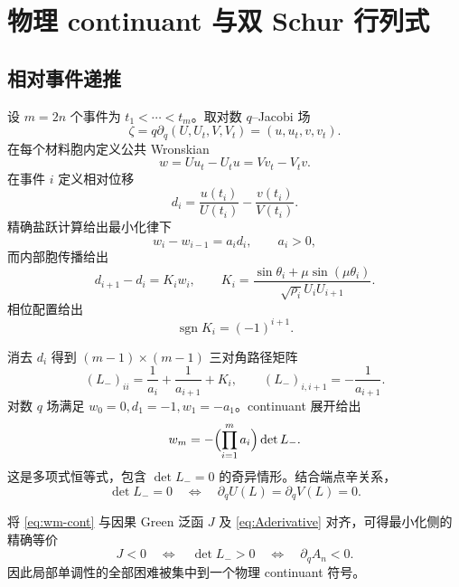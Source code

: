 \documentclass[UTF8,12pt,openany,fontset=fandol]{ctexrep}
\theoremstyle{definition}
\newcommand{\sgn}{\operatorname{sgn}}
\begin{document}
\chapter{物理 continuant 与双 Schur 行列式}

\section{相对事件递推}

设 $m=2n$ 个事件为 $t_1<\cdots<t_m$。取对数 $q$--Jacobi 场
\begin{equation}
 \zeta=q\partial_q(U,U_t,V,V_t)=(u,u_t,v,v_t).
\end{equation}
在每个材料胞内定义公共 Wronskian
\begin{equation}
 w=Uu_t-U_tu=Vv_t-V_tv.
\end{equation}
在事件 $i$ 定义相对位移
\begin{equation}
 d_i=\frac{u(t_i)}{U(t_i)}-\frac{v(t_i)}{V(t_i)}.
\end{equation}
精确盐跃计算给出最小化律下
\begin{equation}\label{eq:eventrec1}
 w_i-w_{i-1}=a_i d_i,\qquad a_i>0,
\end{equation}
而内部胞传播给出
\begin{equation}\label{eq:eventrec2}
 d_{i+1}-d_i=K_iw_i,\qquad
 K_i=\frac{\sin\theta_i+\mu\sin(\mu\theta_i)}{\sqrt{\rho_i}U_iU_{i+1}}.
\end{equation}
相位配置给出
\begin{equation}
 \sgn K_i=(-1)^{i+1}.
\end{equation}

消去 $d_i$ 得到 $(m-1)\times(m-1)$ 三对角路径矩阵
\begin{equation}\label{eq:Lminus}
 (L_-)_{ii}=\frac1{a_i}+\frac1{a_{i+1}}+K_i,\qquad
 (L_-)_{i,i+1}=-\frac1{a_{i+1}}.
\end{equation}
对数 $q$ 场满足 $w_0=0,d_1=-1,w_1=-a_1$。continuant 展开给出
\begin{equation}\label{eq:wm-cont}
 w_m=-\Bigl(\prod_{i=1}^m a_i\Bigr)\det L_-.
\end{equation}
这是多项式恒等式，包含 $\det L_-=0$ 的奇异情形。结合端点辛关系，
\begin{equation}
 \det L_-=0\quad\Longleftrightarrow\quad
 \partial_qU(L)=\partial_qV(L)=0.
\end{equation}

将 \eqref{eq:wm-cont} 与因果 Green 泛函 $J$ 及 \eqref{eq:Aderivative} 对齐，可得最小化侧的精确等价
\begin{equation}\label{eq:R7bridge}
 J<0\quad\Longleftrightarrow\quad
 \det L_->0\quad\Longleftrightarrow\quad
 \partial_qA_n<0.
\end{equation}
因此局部单调性的全部困难被集中到一个物理 continuant 符号。
\end{document}
